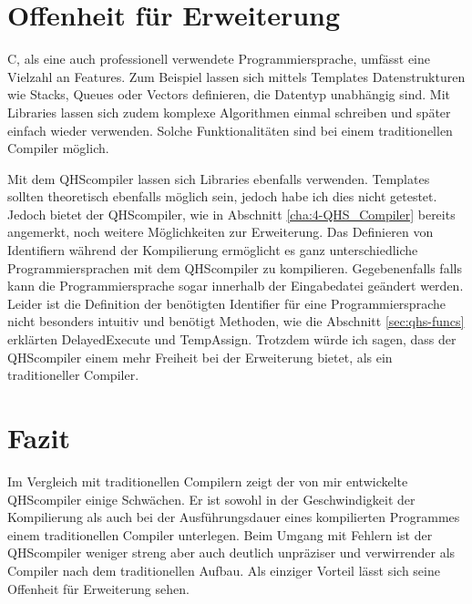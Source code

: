 \section{Offenheit für Erweiterung}
C, als eine auch professionell verwendete Programmiersprache, umfässt eine Vielzahl an Features.
Zum Beispiel lassen sich mittels Templates Datenstrukturen wie Stacks, Queues oder Vectors definieren, die Datentyp unabhängig sind.
Mit Libraries lassen sich zudem komplexe Algorithmen einmal schreiben und später einfach wieder verwenden. Solche Funktionalitäten sind bei einem traditionellen Compiler möglich.

Mit dem QHScompiler lassen sich Libraries ebenfalls verwenden. Templates sollten theoretisch ebenfalls möglich sein, jedoch habe ich dies nicht getestet.
Jedoch bietet der QHScompiler, wie in Abschnitt \ref{cha:4-QHS_Compiler} bereits angemerkt, noch weitere Möglichkeiten zur Erweiterung. 
Das Definieren von Identifiern während der Kompilierung ermöglicht es ganz unterschiedliche Programmiersprachen mit dem QHScompiler zu kompilieren.
Gegebenenfalls falls kann die Programmiersprache sogar innerhalb der Eingabedatei geändert werden. 
Leider ist die Definition der benötigten Identifier für eine Programmiersprache nicht besonders intuitiv und benötigt Methoden, wie die Abschnitt \ref{sec:qhs-funcs} erklärten DelayedExecute und TempAssign.
Trotzdem würde ich sagen, dass der QHScompiler einem mehr Freiheit bei der Erweiterung bietet, als ein traditioneller Compiler.

\section{Fazit}
Im Vergleich mit traditionellen Compilern zeigt der von mir entwickelte QHScompiler einige Schwächen.
Er ist sowohl in der Geschwindigkeit der Kompilierung als auch bei der Ausführungsdauer eines kompilierten Programmes einem traditionellen Compiler unterlegen.
Beim Umgang mit Fehlern ist der QHScompiler weniger streng aber auch deutlich unpräziser und verwirrender als Compiler nach dem traditionellen Aufbau.
Als einziger Vorteil lässt sich seine Offenheit für Erweiterung sehen.

